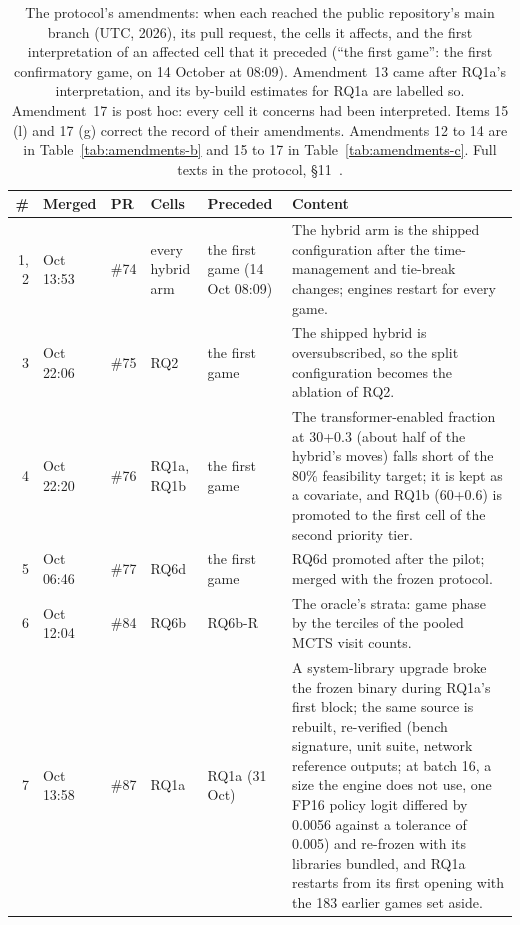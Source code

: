 \documentclass{article}
\newif\ifanon
\newcommand{\depositcite}{\ifanon\cite{anonarchive}\else\cite{zenodo}\fi}
\begin{document}
\begin{table}[ht]
\centering
\caption{The protocol's amendments: when each reached the public repository's main branch (UTC, 2026), its pull request, the cells it affects, and the first interpretation of an affected cell that it preceded (``the first game'': the first confirmatory game, on 14 October at 08:09). Amendment~13 came after RQ1a's interpretation, and its by-build estimates for RQ1a are labelled so. Amendment~17 is post hoc: every cell it concerns had been interpreted. Items 15 (l) and 17 (g) correct the record of their amendments. Amendments 12 to 14 are in Table~\ref{tab:amendments-b} and 15 to 17 in Table~\ref{tab:amendments-c}. Full texts in the protocol, \S11~\depositcite{}.}
\label{tab:amendments}
\footnotesize
\setlength{\tabcolsep}{3pt}
\begin{tabular}{r>{\raggedright\arraybackslash}p{1.95cm}>{\raggedright\arraybackslash}p{1.1cm}>{\raggedright\arraybackslash}p{2.0cm}>{\raggedright\arraybackslash}p{2.1cm}>{\raggedright\arraybackslash}p{6.85cm}}
\toprule
\# & Merged & PR & Cells & Preceded & Content \\
\midrule
1, 2 & 13 Oct 13:53 & \#74 & every hybrid arm & the first game (14 Oct 08:09) & The hybrid arm is the shipped configuration after the time-management and tie-break changes; engines restart for every game. \\
3 & 13 Oct 22:06 & \#75 & RQ2 & the first game & The shipped hybrid is oversubscribed, so the split configuration becomes the ablation of RQ2. \\
4 & 13 Oct 22:20 & \#76 & RQ1a, RQ1b & the first game & The transformer-enabled fraction at 30+0.3 (about half of the hybrid's moves) falls short of the 80\% feasibility target; it is kept as a covariate, and RQ1b (60+0.6) is promoted to the first cell of the second priority tier. \\
5 & 14 Oct 06:46 & \#77 & RQ6d & the first game & RQ6d promoted after the pilot; merged with the frozen protocol. \\
6 & 14 Oct 12:04 & \#84 & RQ6b & RQ6b-R & The oracle's strata: game phase by the terciles of the pooled MCTS visit counts. \\
7 & 14 Oct 13:58 & \#87 & RQ1a & RQ1a (31 Oct) & A system-library upgrade broke the frozen binary during RQ1a's first block; the same source is rebuilt, re-verified (bench signature, unit suite, network reference outputs; at batch 16, a size the engine does not use, one FP16 policy logit differed by 0.0056 against a tolerance of 0.005) and re-frozen with its libraries bundled, and RQ1a restarts from its first opening with the 183 earlier games set aside. \\

\end{tabular}
\end{table}
\end{document}
